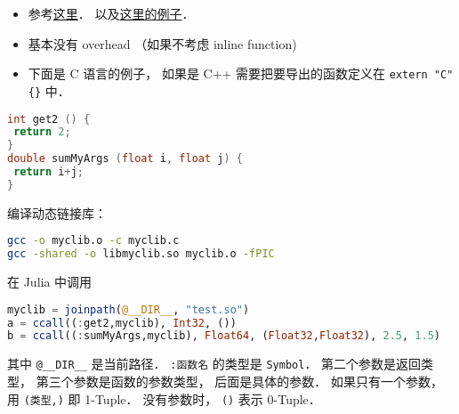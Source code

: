 
\begin{issues}
\issueDraft
\end{issues}

\begin{itemize}
\item 参考\href{https://docs.julialang.org/en/v1/manual/calling-c-and-fortran-code/}{这里}． 以及\href{https://discourse.julialang.org/t/how-to-make-julia-call-c-c-coded-function/54780/5}{这里的例子}．
\item 基本没有 overhead （如果不考虑 inline function)
\item 下面是 C 语言的例子， 如果是 C++ 需要把要导出的函数定义在 \verb|extern "C" {}| 中．
\end{itemize}

\begin{lstlisting}[language=cpp]
int get2 () {
 return 2;
}
double sumMyArgs (float i, float j) {
 return i+j;
}
\end{lstlisting}

编译动态链接库：
\begin{lstlisting}[language=bash]
gcc -o myclib.o -c myclib.c
gcc -shared -o libmyclib.so myclib.o -fPIC
\end{lstlisting}

在 Julia 中调用
\begin{lstlisting}[language=julia]
myclib = joinpath(@__DIR__, "test.so")
a = ccall((:get2,myclib), Int32, ())
b = ccall((:sumMyArgs,myclib), Float64, (Float32,Float32), 2.5, 1.5)
\end{lstlisting}
其中 \verb|@__DIR__| 是当前路径． \verb|:函数名| 的类型是 \verb|Symbol|． 第二个参数是返回类型， 第三个参数是函数的参数类型， 后面是具体的参数． 如果只有一个参数， 用 \verb|(类型,)| 即 1-Tuple． 没有参数时， \verb|()| 表示 0-Tuple．
